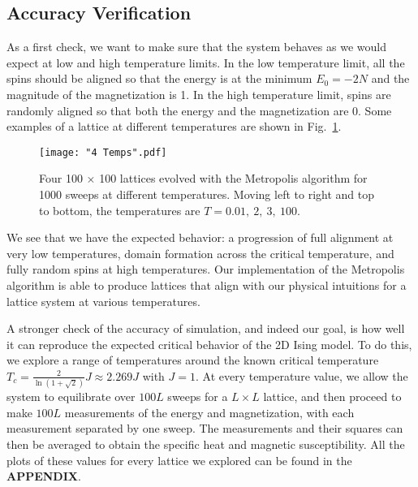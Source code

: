 \documentclass[twocolumn,aps,prl]{revtex4-1} %
\begin{document}
\subsection{Accuracy Verification}
As a first check, we want to make sure that the system behaves as we would expect at low and high temperature limits. In the low temperature limit, all the spins should be aligned so that the energy is at the minimum $E_0 = -2N$ and the magnitude of the magnetization is 1. In the high temperature limit, spins are randomly aligned so that both the energy and the magnetization are 0. Some examples of a lattice at different temperatures are shown in Fig.~\ref{fig:4temps}. 
\begin{figure}
	\texttt{[image: "4 Temps".pdf]}
	\caption{\label{fig:4temps} Four 100 $\times$ 100 lattices evolved with the Metropolis algorithm for 1000 sweeps at different temperatures. Moving left to right and top to bottom, the temperatures are $T = 0.01,\ 2,\ 3,\ 100$.}
\end{figure}

We see that we have the expected behavior: a progression of full alignment at very low temperatures, domain formation across the critical temperature, and fully random spins at high temperatures. Our implementation of the Metropolis algorithm is able to produce lattices that align with our physical intuitions for a lattice system at various temperatures.

A stronger check of the accuracy of simulation, and indeed our goal, is how well it can reproduce the expected critical behavior of the 2D Ising model. To do this, we explore a range of temperatures around the known critical temperature $T_c = \frac{2}{\ln(1+\sqrt{2})}J \approx 2.269J$ with $J = 1$. At every temperature value, we allow the system to equilibrate over $100L$ sweeps for a $L \times L$ lattice, and then proceed to make $100L$ measurements of the energy and magnetization, with each measurement separated by one sweep. The measurements and their squares can then be averaged to obtain the specific heat and magnetic susceptibility. All the plots of these values for every lattice we explored can be found in the \textbf{APPENDIX}.
\end{document}
